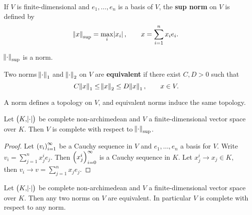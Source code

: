 \begin{example*}
If $ V $ is finite-dimensional and $ e_1, \dots, e_n $ is a basis of $ V $, the \textbf{sup norm} on $ V $ is defined by
$$ \norm{x}_{\sup} = \max_i \abs{x_i}, \qquad x = \sum_{i = 1}^n x_ie_i. $$
\end{example*}

\begin{exercise*}
$ \norm{\cdot}_{\sup} $ is a norm.
\end{exercise*}

\begin{definition}
Two norms $ \norm{\cdot}_1 $ and $ \norm{\cdot}_2 $ on $ V $ are \textbf{equivalent} if there exist $ C, D > 0 $ such that
$$ C\norm{x}_1 \le \norm{x}_2 \le D\norm{x}_1, \qquad x \in V. $$
\end{definition}

\begin{fact*}
A norm defines a topology on $ V $, and equivalent norms induce the same topology.
\end{fact*}

\begin{proposition}
Let $ \br{K, \abs{\cdot}} $ be complete non-archimedean and $ V $ a finite-dimensional vector space over $ K $. Then $ V $ is complete with respect to $ \norm{\cdot}_{\sup} $.
\end{proposition}

\begin{proof}
Let $ \br{v_i}_{i = 1}^\infty $ be a Cauchy sequence in $ V $ and $ e_1, \dots, e_n $ a basis for $ V $. Write $ v_i = \sum_{j = 1}^n x_j^ie_j $. Then $ \br{x_j^i}_{i = 0}^\infty $ is a Cauchy sequence in $ K $. Let $ x_j^i \to x_j \in K $, then $ v_i \to v = \sum_{j = 1}^n x_je_j $.
\end{proof}

\begin{theorem}
\label{thm:6.5}
Let $ \br{K, \abs{\cdot}} $ be complete non-archimedean and $ V $ a finite-dimensional vector space over $ K $. Then any two norms on $ V $ are equivalent. In particular $ V $ is complete with respect to any norm.
\end{theorem}


